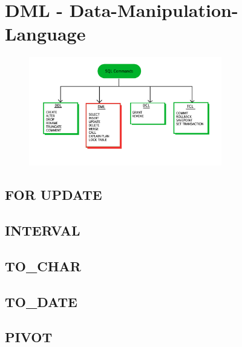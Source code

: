 \section[DML]{DML - Data-Manipulation-Language}
\label{sec:dml}

\begin{figure}[h]
  \centering
  \includegraphics[width=0.75\textwidth]{img//sql-commands-dml.jpg}
  \label{img:dml}
\end{figure}

\subsection{FOR UPDATE}
\label{sec:dml.for_update}

\subsection{INTERVAL}
\label{sec:dml.interval}

\subsection{TO\_CHAR}
\label{sec:dml.to_char}

\subsection{TO\_DATE}
\label{sec:dml.to_date}

\subsection{PIVOT}
\label{sec:dml.pivot}
